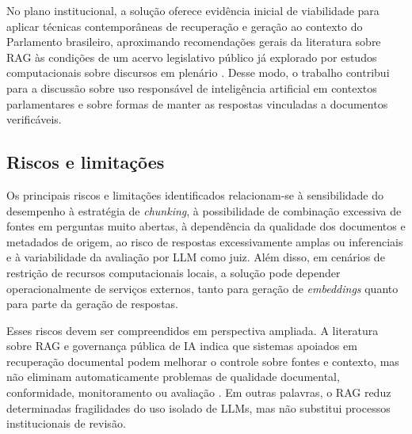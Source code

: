 No plano institucional, a solução oferece evidência inicial de viabilidade para aplicar técnicas contemporâneas de recuperação e geração ao contexto do Parlamento brasileiro, aproximando recomendações gerais da literatura sobre RAG às condições de um acervo legislativo público já explorado por estudos computacionais sobre discursos em plenário \parencite{blanco2025plenarioPalanqueEstudio,blanco2026letrasGraudas}. Desse modo, o trabalho contribui para a discussão sobre uso responsável de inteligência artificial em contextos parlamentares e sobre formas de manter as respostas vinculadas a documentos verificáveis.

\subsection{Riscos e limitações}

Os principais riscos e limitações identificados relacionam-se à sensibilidade do desempenho à estratégia de \textit{chunking}, à possibilidade de combinação excessiva de fontes em perguntas muito abertas, à dependência da qualidade dos documentos e metadados de origem, ao risco de respostas excessivamente amplas ou inferenciais e à variabilidade da avaliação por LLM como juiz. Além disso, em cenários de restrição de recursos computacionais locais, a solução pode depender operacionalmente de serviços externos, tanto para geração de \textit{embeddings} quanto para parte da geração de respostas.

Esses riscos devem ser compreendidos em perspectiva ampliada. A literatura sobre RAG e governança pública de IA indica que sistemas apoiados em recuperação documental podem melhorar o controle sobre fontes e contexto, mas não eliminam automaticamente problemas de qualidade documental, conformidade, monitoramento ou avaliação \parencite{gao2023ragSurvey,deAlmeidaSantos2025aiGovernance,saadFalconEtAl2024ares}. Em outras palavras, o RAG reduz determinadas fragilidades do uso isolado de LLMs, mas não substitui processos institucionais de revisão.
